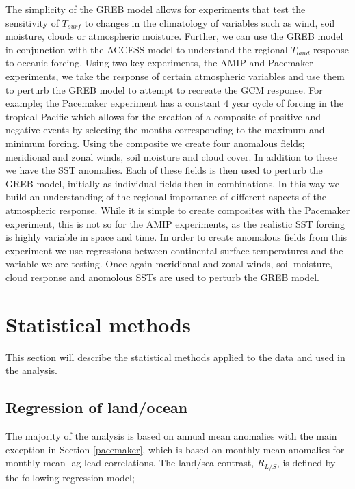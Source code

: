 The simplicity of the GREB model allows for experiments that test the 
sensitivity of $T_{surf}$ to changes in the climatology of variables such as 
wind, soil moisture, clouds or atmospheric moisture. Further, we can use the 
GREB model in conjunction with the ACCESS model to understand the regional 
$T_{land}$ response to oceanic forcing. Using two key experiments, the AMIP and 
Pacemaker experiments, we take the response of certain atmospheric variables and 
use them to perturb the GREB model to attempt to recreate the GCM response. For 
example; the Pacemaker experiment has a constant 4 year cycle of forcing in the 
tropical Pacific which allows for the creation of a composite of positive and 
negative events by selecting the months corresponding to the maximum and minimum 
forcing.  Using the composite we create four anomalous fields; meridional and 
zonal winds, soil moisture and cloud cover. In addition to these we have the SST 
anomalies.  Each of these fields is then used to perturb the GREB model, 
initially as individual fields then in combinations. In this way we build an 
understanding of the regional importance of different aspects of the atmospheric 
response. While it is simple to create composites with the Pacemaker experiment, 
this is not so for the AMIP experiments, as the realistic SST forcing is highly 
variable in space and time.  In order to create anomalous fields from this 
experiment we use regressions between continental surface temperatures and the 
variable we are testing. Once again meridional and zonal winds, soil moisture, 
cloud response and anomolous SSTs are used to perturb the GREB model.



\section{Statistical methods}

This section will describe the statistical methods applied to the data and used 
in the analysis.


\subsection{Regression of land/ocean}\label{ssec:rlo}


The majority of the analysis is based on annual mean anomalies with the main 
exception in Section \ref{pacemaker}, which is based on monthly mean anomalies 
for monthly mean lag-lead correlations. The land/sea contrast, $R_{L/S}$, is 
defined by the following regression model;

